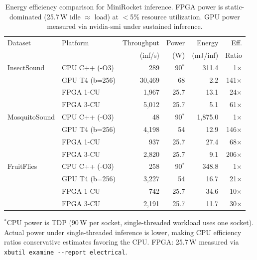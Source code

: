 % 

\begin{table}[t]
\centering
\caption{Energy efficiency comparison for MiniRocket inference. FPGA power
is static-dominated (25.7\,W idle $\approx$ load) at $<$5\% resource
utilization. GPU power measured via nvidia-smi under sustained inference.}
\label{tab:power}
\small
\begin{tabular}{llrrrr}
\toprule
Dataset & Platform & Throughput & Power & Energy & Eff. \\
 & & (inf/s) & (W) & (mJ/inf) & Ratio \\
\midrule
InsectSound & CPU C++ (-O3) & 289 & 90$^{*}$ & 311.4 & 1$\times$ \\
 & GPU T4 (b=256) & 30,469 & 68 & 2.2 & 141$\times$ \\
 & FPGA 1-CU & 1,967 & 25.7 & 13.1 & 24$\times$ \\
 & FPGA 3-CU & 5,012 & 25.7 & 5.1 & 61$\times$ \\
\midrule
MosquitoSound & CPU C++ (-O3) & 48 & 90$^{*}$ & 1,875.0 & 1$\times$ \\
 & GPU T4 (b=256) & 4,198 & 54 & 12.9 & 146$\times$ \\
 & FPGA 1-CU & 937 & 25.7 & 27.4 & 68$\times$ \\
 & FPGA 3-CU & 2,820 & 25.7 & 9.1 & 206$\times$ \\
\midrule
FruitFlies & CPU C++ (-O3) & 258 & 90$^{*}$ & 348.8 & 1$\times$ \\
 & GPU T4 (b=256) & 3,227 & 54 & 16.7 & 21$\times$ \\
 & FPGA 1-CU & 742 & 25.7 & 34.6 & 10$\times$ \\
 & FPGA 3-CU & 2,191 & 25.7 & 11.7 & 30$\times$ \\
\bottomrule
\end{tabular}

\vspace{1mm}
{\footnotesize $^{*}$CPU power is TDP (90\,W per socket, single-threaded workload uses one socket). Actual power under single-threaded inference is lower, making CPU efficiency ratios conservative estimates favoring the CPU. FPGA: 25.7\,W measured via \texttt{xbutil examine -{}-report electrical}.}
\end{table}
